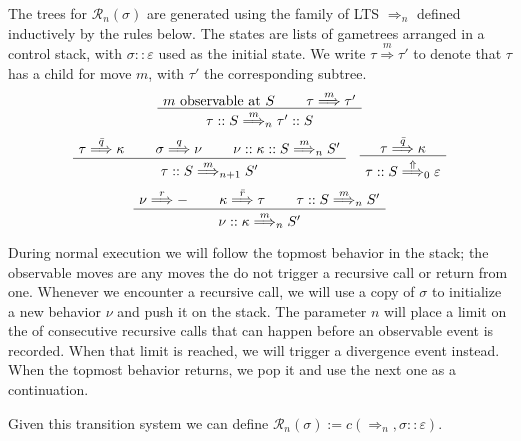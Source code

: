 \documentclass{article}
\newcommand{\kw}[1]{{\mathsf{#1}}}
\begin{document}
The trees for $\mathcal{R}_n(\sigma)$ are generated
using the family of LTS $\Rightarrow_n$ defined inductively
by the rules below.
The states are lists of gametrees arranged in a control stack,
with $\sigma :: \varepsilon$ used as the initial state.
We write $\tau \stackrel{m}{\Longrightarrow} \tau'$
to denote that $\tau$ has a child for move $m$,
with $\tau'$ the corresponding subtree.
\[
  \AxiomC{$m \mbox{ observable at } S$}
  \AxiomC{$\tau \stackrel{m}{\Longrightarrow} \tau'$}
  \BinaryInfC{$\tau :: S \stackrel{m}{\Longrightarrow}_n \tau' :: S$}
  \DisplayProof
\]
\[
  \AxiomC{$\tau \stackrel{\bar{q}}{\Longrightarrow} \kappa$}
  \AxiomC{$\sigma \stackrel{q}{\Longrightarrow} \nu$}
  \AxiomC{$\nu :: \kappa :: S \stackrel{m}{\Longrightarrow}_n S'$}
  \TrinaryInfC{$\tau :: S \stackrel{m}{\Longrightarrow}_{n+1} S'$}
  \DisplayProof
  \quad
  \AxiomC{$\tau \stackrel{\bar{q}}{\Longrightarrow} \kappa$}
  \UnaryInfC{$\tau :: S \stackrel{\Uparrow}{\Longrightarrow}_0 \varepsilon$}
  \DisplayProof
\]
\vspace{.5em}
\[
  \AxiomC{$\nu \stackrel{r}{\Longrightarrow} {-}$}
  \AxiomC{$\kappa \stackrel{\bar{r}}{\Longrightarrow} \tau$}
  \AxiomC{$\tau :: S \stackrel{m}{\Longrightarrow}_n S'$}
  \TrinaryInfC{$\nu :: \kappa \stackrel{m}{\Longrightarrow}_n S'$}
  \DisplayProof
\]
\vspace{.3em}

During normal execution we will follow the topmost behavior in the stack;
the observable moves are any moves the do not trigger a recursive call
or return from one.
Whenever we encounter a recursive call,
we will use a copy of $\sigma$
to initialize a new behavior $\nu$ and push it on the stack.
The parameter $n$ will place a limit on
the of consecutive recursive calls that can happen
before an observable event is recorded.
When that limit is reached,
we will trigger a divergence event instead.
When the topmost behavior returns,
we pop it and use the next one as a continuation.

Given this transition system we can define
$\mathcal{R}_n(\sigma) := c({\Rightarrow_n}, \sigma :: \varepsilon)$.




\end{document}
